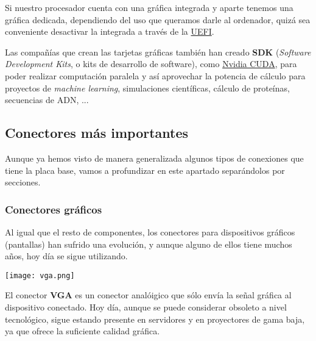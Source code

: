 Si nuestro procesador cuenta con una gráfica integrada y aparte tenemos una gráfica dedicada, dependiendo del uso que queramos darle al ordenador, quizá sea conveniente desactivar la integrada a través de la \hyperlink{UEFI}{UEFI}.


Las compañías que crean las tarjetas gráficas también han creado \textbf{SDK} (\textit{Software Development Kits}, o kits de desarrollo de software), como \href{https://en.wikipedia.org/wiki/CUDA}{Nvidia CUDA}, para poder realizar computación paralela y así aprovechar la potencia de cálculo para proyectos de \textit{machine learning},  simulaciones científicas, cálculo de proteínas, secuencias de ADN, ...



\subsection{Conectores más importantes}

Aunque ya hemos visto de manera generalizada algunos tipos de conexiones que tiene la placa base, vamos a profundizar en este apartado separándolos por secciones.

\subsubsection{Conectores gráficos}
Al igual que el resto de componentes, los conectores para dispositivos gráficos (pantallas) han sufrido una evolución, y aunque alguno de ellos tiene muchos años, hoy día se sigue utilizando.

 \begin{minipage}{0.15\linewidth}
    \texttt{[image: vga.png]}
\end{minipage}
\hfill
\begin{minipage}{0.8\linewidth}
     El conector \textbf{VGA} es un conector analóigico que sólo envía la señal gráfica al dispositivo conectado. Hoy día, aunque se puede considerar obsoleto a nivel tecnológico, sigue estando presente en servidores y en proyectores de gama baja, ya que ofrece la suficiente calidad gráfica.
\end{minipage}


